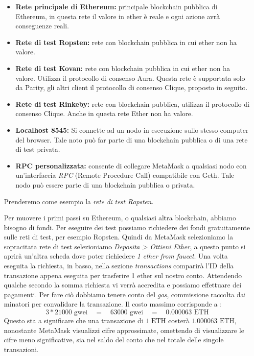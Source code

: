 \begin{itemize}
	\item \textbf{Rete principale di Ethereum:} principale blockchain pubblica di Ethereum, in questa rete il valore in ether è reale e ogni azione avrà conseguenze reali.
	\item \textbf{Rete di test Ropsten:} rete con blockchain pubblica in cui ether non ha valore.
	\item \textbf{Rete di test Kovan:} rete con blockchain pubblica in cui ether non ha valore. Utilizza il protocollo di consenso Aura. Questa rete è supportata solo da Parity, gli altri client il protocollo di consenso Clique, proposto in seguito. 
	\item \textbf{Rete di test Rinkeby:} rete con blockchain pubblica, utilizza il protocollo di consenso Clique. Anche in questa rete Ether non ha valore.
	\item \textbf{Localhost 8545:} Si connette ad un nodo in esecuzione sullo stesso computer del browser. Tale noto può far parte di una blockchain pubblica o di una rete di test privata.
	\item \textbf{RPC personalizzata:} consente di collegare MetaMask a qualsiasi nodo con un'interfaccia \textit{RPC} (Remote Procedure Call) compatibile con Geth. Tale nodo può essere parte di una blockchain pubblica o privata. 	
\end{itemize}
Prenderemo come esempio la \textit{rete di test Ropsten}.

Per muovere i primi passi su Ethereum, o qualsiasi altra blockchain, abbiamo bisogno di fondi. Per eseguire dei test possiamo richiedere dei fondi gratuitamente sulle reti di test, per esempio Ropsten. Quindi da MetaMask selezioniamo la sopracitata rete di test selezioniamo \textit{Deposita > Ottieni Ether}, a questo punto si aprirà un'altra scheda dove poter richiedere \textit{1 ether from faucet}. Una volta eseguita la richiesta, in basso, nella sezione \textit{transactions} comparirà l'ID della transazione appena eseguita per trasferire 1 ether sul nostro conto. Attendendo qualche secondo la somma richiesta vi verrà accredita e possiamo effettuare dei pagamenti. Per fare ciò dobbiamo tenere conto del \textit{gas}, commissione raccolta dai minatori per convalidare la transazione. Il costo massimo corrisponde a :
\[ 3*21000 \text{ gwei} \quad = \quad 63000 \text{ gwei} \quad = \quad 0.000063 \text{ ETH}\]
Questo sta a significare che una transazione di $ 1 \text{ ETH} $ costerà $ 1.000063 \text{ ETH} $, nonostante MetaMask visualizzi cifre approssimate, omettendo di visualizzare le cifre meno significative, sia nel saldo del conto che nel totale delle singole transazioni.

